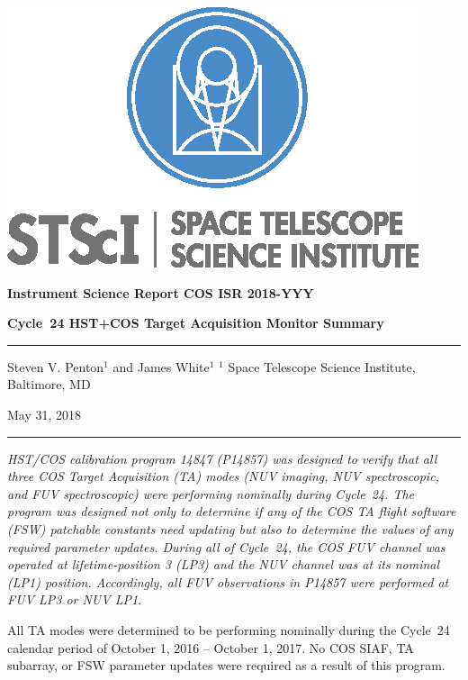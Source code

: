 \documentclass[12pt]{reportj}
\newcommand{\pid}[1]{{\rm P}#1}
\newcommand{\thisISR}[1]{COS ISR 2018-YYY}
\begin{document}
\vspace{-2.5cm}
\noindent\includegraphics*[width=0.295\linewidth]{new_st_logo.eps}

\vspace{-0.5cm}

\begin{flushright}
{\bf Instrument Science Report \thisISR{}}

\vspace{1.0cm}
{\bf\Huge Cycle~24 HST+COS Target Acquisition Monitor Summary}

\rule{0.25\linewidth}{0.5pt}

\vspace{0.4cm}
Steven V. Penton$^1$ and James White$^1$
\linebreak
\newline
\footnotesize{$^1$ Space Telescope Science Institute, Baltimore, MD}
\vspace{0.5cm}

May 31, 2018
\end{flushright}
\vspace{-0.3cm}
\noindent\rule{\linewidth}{1.0pt}

{\it \noindent
HST/COS calibration program 14847 (\pid{14857}) was designed to verify that all three COS Target Acquisition (TA) modes (NUV imaging, NUV spectroscopic, and FUV spectroscopic)
 were performing nominally during Cycle~24. The program was designed not only to determine if any of the COS TA flight software (FSW) patchable constants need updating but also to determine the values of any required parameter updates.
During all of Cycle~24, the COS FUV channel was operated at lifetime-position 3 (LP3) and the NUV channel was at its nominal (LP1) position. Accordingly, all FUV observations in \pid{14857} were performed at FUV LP3 or NUV LP1.

All TA modes were determined to be performing nominally during the Cycle~24 calendar period of October 1, 2016 -- October 1, 2017. No COS SIAF, TA subarray, or FSW parameter updates were required as a result of this program. }
\end{document}
